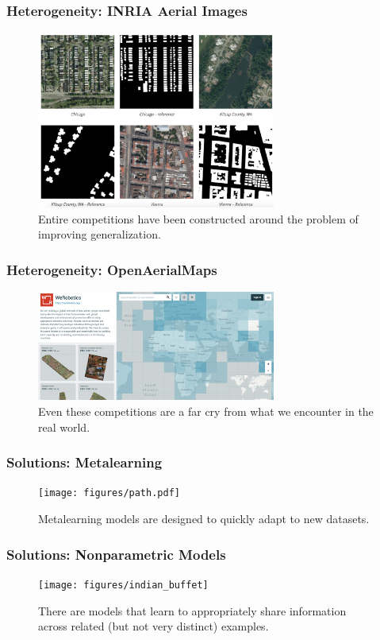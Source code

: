 \documentclass[10pt,mathserif]{beamer}
\begin{document}
\begin{frame}
  \frametitle{Heterogeneity: INRIA Aerial Images}
  \begin{figure}[ht]
    \centering
    \includegraphics[width=0.7\textwidth]{figures/inria}
    \caption{Entire competitions have been constructed around the problem of
      improving generalization. \label{fig:label} }
  \end{figure}
\end{frame}

\begin{frame}
  \frametitle{Heterogeneity: OpenAerialMaps}
  \begin{figure}[ht]
    \centering
    \includegraphics[width=0.7\textwidth]{figures/openaerialmaps}
    \caption{Even these competitions are a far cry from what we encounter in the
      real world.
      \label{fig:label} }
  \end{figure}
\end{frame}

\begin{frame}[]
  \frametitle{Solutions: Metalearning}
\begin{figure}[ht]
  \centering
  \texttt{[image: figures/path.pdf]}
  \caption{Metalearning models are designed to quickly adapt to new
    datasets. \label{fig:label} }
\end{figure}
\end{frame}

\begin{frame}[]
  \frametitle{Solutions: Nonparametric Models}
  \begin{figure}[ht]
    \centering
    \texttt{[image: figures/indian\_buffet]}
    \caption{There are models that learn to appropriately share information
      across related (but not very distinct) examples. \label{fig:label} }
\end{figure}
\end{frame}
\end{document}
